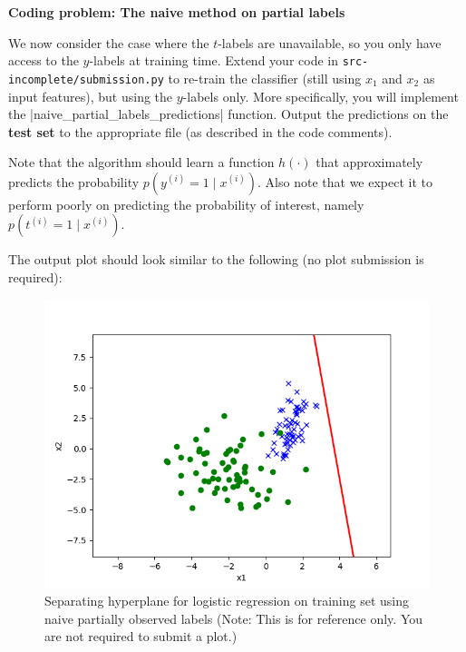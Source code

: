 \item {} \textbf{Coding problem: The naive method on partial labels}

We now consider the case where the $t$-labels are unavailable, so you only have
access to the $y$-labels at training time. Extend your code in
\texttt{src-incomplete/submission.py} to re-train the classifier (still using $x_1$ and
$x_2$ as input features), but using the $y$-labels only. More specifically, you will implement
the |naive_partial_labels_predictions| function. Output the predictions
on the \textbf{test set} to the appropriate file (as described in the code comments).

Note that the algorithm should learn a function $h(\cdot)$ that approximately predicts the probability $p(y^{(i)}=1\mid x^{(i)})$. Also note that we expect it to perform poorly on predicting the probability of interest, namely $p(t^{(i)}=1\mid x^{(i)})$.

The output plot should look similar to the following (no plot submission is required):
\begin{figure}[H]
	\centering
	\vspace{2mm}
	\includegraphics[width=0.5\linewidth]{02-posonly/posonly_naive_pred.png}
    \caption{Separating hyperplane for logistic regression on training set using naive partially observed labels (Note: This is for reference only.  You are not required to submit a plot.)}
\end{figure}

